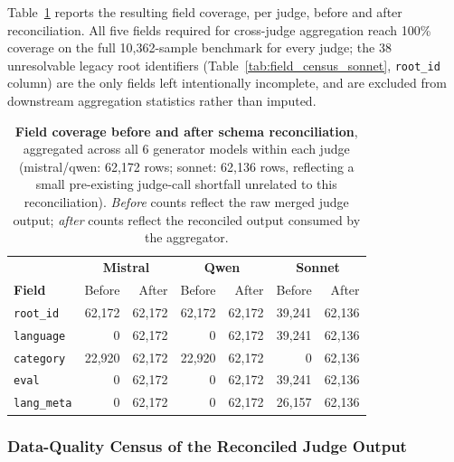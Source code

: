 Table~\ref{tab:field_reconciliation_summary} reports the resulting field
coverage, per judge, before and after reconciliation. All five
fields required for cross-judge aggregation reach 100\% coverage on the full
10{,}362-sample benchmark for every judge; the 38 unresolvable legacy root
identifiers (Table~\ref{tab:field_census_sonnet}, \texttt{root\_id} column)
are the only fields left intentionally incomplete, and are excluded from
downstream aggregation statistics rather than imputed.

\begin{table}[t]
\centering
\small
\caption{
\textbf{Field coverage before and after schema reconciliation}, aggregated
across all 6 generator models within each judge (mistral/qwen: 62{,}172
rows; sonnet: 62{,}136 rows, reflecting a small pre-existing judge-call
shortfall unrelated to this reconciliation). \emph{Before} counts reflect the
raw merged judge output; \emph{after} counts reflect the reconciled output
consumed by the aggregator.
}
\label{tab:field_reconciliation_summary}
\begin{tabular}{lrrrrrr}
\toprule
& \multicolumn{2}{c}{\textbf{Mistral}} & \multicolumn{2}{c}{\textbf{Qwen}} & \multicolumn{2}{c}{\textbf{Sonnet}} \\
\textbf{Field} & Before & After & Before & After & Before & After \\
\midrule
\texttt{root\_id}   & 62{,}172 & 62{,}172 & 62{,}172 & 62{,}172 & 39{,}241 & 62{,}136 \\
\texttt{language}   & 0        & 62{,}172 & 0        & 62{,}172 & 39{,}241 & 62{,}136 \\
\texttt{category}   & 22{,}920 & 62{,}172 & 22{,}920 & 62{,}172 & 0        & 62{,}136 \\
\texttt{eval}        & 0        & 62{,}172 & 0        & 62{,}172 & 39{,}241 & 62{,}136 \\
\texttt{lang\_meta}  & 0        & 62{,}172 & 0        & 62{,}172 & 26{,}157 & 62{,}136 \\
\bottomrule
\end{tabular}
\end{table}

\subsubsection{Data-Quality Census of the Reconciled Judge Output}
\label{sec:field_census}

